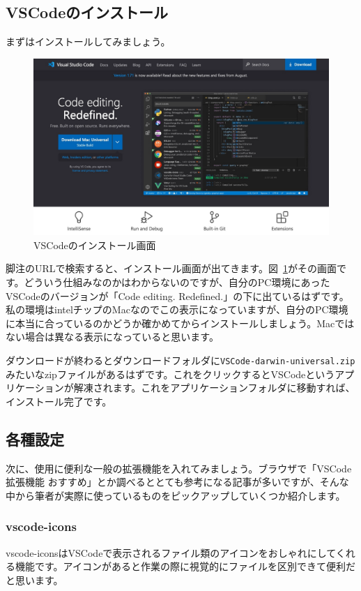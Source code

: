\subsection{VSCodeのインストール}
まずはインストールしてみましょう。
\begin{figure}[h]
	\centering
	\includegraphics[width=0.7\linewidth]{./fig/appendix/vscode_install.png}
	\caption{VSCodeのインストール画面}
	\label{fig:vscode_install}
\end{figure}
脚注のURLで検索すると、インストール画面が出てきます。図~\ref{fig:vscode_install}がその画面です。どういう仕組みなのかはわからないのですが、自分のPC環境にあったVSCodeのバージョンが「Code editing. Redefined.」の下に出ているはずです。私の環境はintelチップのMacなのでこの表示になっていますが、自分のPC環境に本当に合っているのかどうか確かめてからインストールしましょう。Macではない場合は異なる表示になっていると思います。\par
ダウンロードが終わるとダウンロードフォルダに\texttt{VSCode-darwin-universal.zip}みたいなzipファイルがあるはずです。これをクリックするとVSCodeというアプリケーションが解凍されます。これをアプリケーションフォルダに移動すれば、インストール完了です。

\subsection{各種設定}
次に、使用に便利な一般の拡張機能を入れてみましょう。ブラウザで「VSCode 拡張機能 おすすめ」とか調べるととても参考になる記事が多いですが、そんな中から筆者が実際に使っているものをピックアップしていくつか紹介します。

\subsubsection{vscode-icons}
vscode-iconsはVSCodeで表示されるファイル類のアイコンをおしゃれにしてくれる機能です。アイコンがあると作業の際に視覚的にファイルを区別できて便利だと思います。

